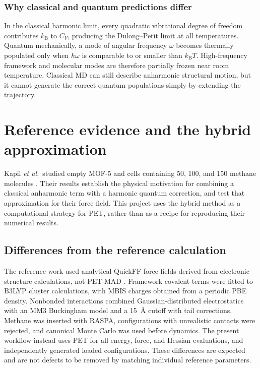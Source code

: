 \documentclass[10pt,a4paper,twocolumn]{article}
\newcommand{\cv}{\ensuremath{C_V}}
\begin{document}
\subsubsection{Why classical and quantum predictions differ}

In the classical harmonic limit, every quadratic vibrational degree of
freedom contributes $k_{\mathrm B}$ to \cv, producing the Dulong--Petit limit
at all temperatures. Quantum mechanically, a mode of angular frequency
$\omega$ becomes thermally populated only when $\hbar\omega$ is comparable to
or smaller than $k_{\mathrm B}T$. High-frequency framework and molecular modes
are therefore partially frozen near room temperature. Classical MD can still
describe anharmonic structural motion, but it cannot generate the correct
quantum populations simply by extending the trajectory.

\section{Reference evidence and the hybrid approximation}

Kapil \emph{et al.}\ studied empty MOF-5 and cells containing 50, 100, and
150 methane molecules \cite{kapil2019}. Their results establish the physical
motivation for combining a classical anharmonic term with a harmonic quantum
correction, and test that approximation for their force field. This project
uses the hybrid method as a computational strategy for PET, rather than as a
recipe for reproducing their numerical results.

\subsection{Differences from the reference calculation}

The reference work used analytical QuickFF force fields derived from
electronic-structure calculations, not PET-MAD \cite{quickff}. Framework
covalent terms were
fitted to B3LYP cluster calculations, with MBIS charges obtained from a
periodic PBE density. Nonbonded interactions combined Gaussian-distributed
electrostatics with an MM3 Buckingham model and a \SI{15}{\angstrom} cutoff
with tail corrections. Methane was inserted with RASPA, configurations with
unrealistic contacts were rejected, and canonical Monte Carlo was used before
dynamics. The present workflow instead uses PET for all energy, force, and
Hessian evaluations, and independently generated loaded configurations.
These differences are expected and are not defects to be removed by matching
individual reference parameters.
\end{document}
